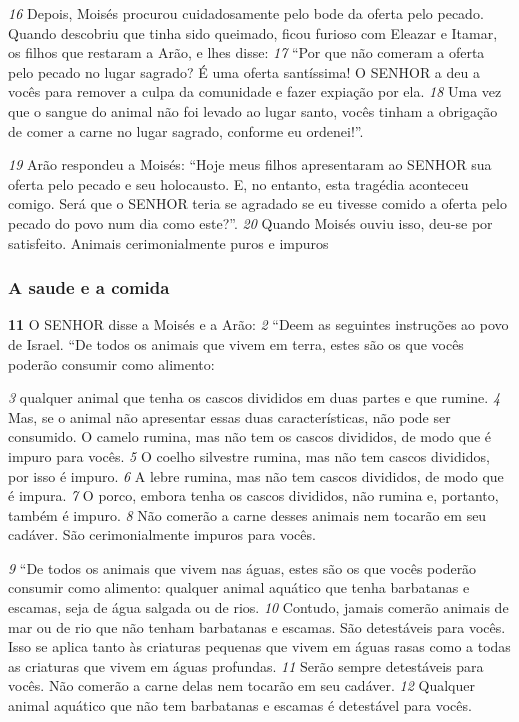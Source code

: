 \smallskip 
\textit{\tiny 16}
Depois, Moisés procurou cuidadosamente pelo bode da oferta pelo pecado.
Quando descobriu que tinha sido queimado, ficou furioso com Eleazar e Itamar,
os filhos que restaram a Arão, e lhes disse: 
\textit{\tiny 17}
“Por que não comeram a oferta pelo
pecado no lugar sagrado? É uma oferta santíssima! O SENHOR a deu a vocês para
remover a culpa da comunidade e fazer expiação por ela. 
\textit{\tiny 18}
Uma vez que o sangue
do animal não foi levado ao lugar santo, vocês tinham a obrigação de comer a
carne no lugar sagrado, conforme eu ordenei!”.

\smallskip 
\textit{\tiny 19}
Arão respondeu a Moisés: “Hoje meus filhos apresentaram ao SENHOR sua
oferta pelo pecado e seu holocausto. E, no entanto, esta tragédia aconteceu
comigo. Será que o SENHOR teria se agradado se eu tivesse comido a oferta pelo
pecado do povo num dia como este?”. 
\textit{\tiny 20}
Quando Moisés ouviu isso, deu-se por
satisfeito.
Animais cerimonialmente puros e impuros
   
\bigskip
\subsubsection*{A saude e a comida}
\textbf{\large 11}
 O SENHOR disse a Moisés e a Arão: 
\textit{\tiny 2} 
“Deem as seguintes instruções ao povo
de Israel.
  “De todos os animais que vivem em terra,
 estes são os que vocês poderão
consumir como alimento: 

\smallskip 
\textit{\tiny 3} 
qualquer animal que tenha os cascos divididos em
duas partes e que rumine. 
\textit{\tiny 4} 
Mas, se o animal não apresentar essas duas
características, não pode ser consumido. O camelo rumina, mas não tem os cascos
divididos, de modo que é impuro para vocês. 
\textit{\tiny 5} 
O coelho silvestre
 rumina, mas
não tem cascos divididos, por isso é impuro. 
\textit{\tiny 6} 
A lebre rumina, mas não tem cascos
divididos, de modo que é impura. 
\textit{\tiny 7} 
O porco, embora tenha os cascos divididos,
não rumina e, portanto, também é impuro. 
\textit{\tiny 8} 
Não comerão a carne desses animais
nem tocarão em seu cadáver. São cerimonialmente impuros para vocês. 

\smallskip 
\textit{\tiny 9} 
“De todos os animais que vivem nas águas, estes são os que vocês poderão
consumir como alimento: qualquer animal aquático que tenha barbatanas e
escamas, seja de água salgada ou de rios. 
\textit{\tiny 10}
Contudo, jamais comerão animais de
mar ou de rio que não tenham barbatanas e escamas. São detestáveis para vocês.
Isso se aplica tanto às criaturas pequenas que vivem em águas rasas como a todas
as criaturas que vivem em águas profundas. 
\textit{\tiny 11}
Serão sempre detestáveis para
vocês. Não comerão a carne delas nem tocarão em seu cadáver. 
\textit{\tiny 12}
Qualquer
animal aquático que não tem barbatanas e escamas é detestável para vocês.

